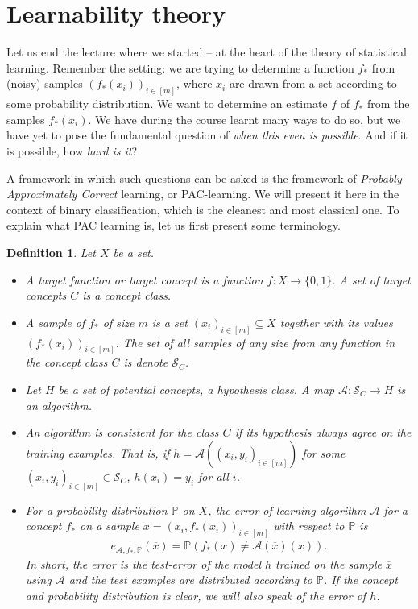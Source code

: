 \documentclass{article}
\newcommand{\calA}{\mathcal{A}}
\newcommand{\calS}{\mathcal{S}}
\newcommand{\sse}{\subseteq}
\newtheorem{defi}{Definition}
\begin{document}
   

\section{Learnability theory}
Let us end the lecture where we started -- at the heart of the theory of statistical learning. Remember the setting: we are trying to determine a function $f_*$ from (noisy) samples $(f_*(x_i))_{i \in [m]}$, where $x_i$ are drawn from a set according to some probability distribution. We want to determine an estimate $f$ of $f_*$ from the samples $f_*(x_i)$. We have during the course learnt many ways to do so, but we have yet to pose the fundamental question of \emph{when this even is possible}. And if it is possible, how \emph{hard is it}? 

A framework in which such questions can be asked is the framework of \emph{Probably Approximately Correct} learning, or PAC-learning.
We will present it here in the context of binary classification, which is the cleanest and most classical one. To explain what PAC learning is, let us first present some terminology.
\begin{defi}
    Let $X$ be a set. 
    \begin{itemize}
        \item A \emph{target function} or \emph{target concept} is a function $f:X \to \{0,1\}$. A set of target concepts $C$ is a \emph{concept class}. 

        \item A \emph{sample of $f_*$} of size $m$ is a set $(x_i)_{i \in [m]}\sse X$ together with its values $(f_*(x_i))_{i \in [m]}$. The set of all samples of any size from any function in the concept class $C$ is denote $\calS_C$.

        \item Let $H$ be a set of potential concepts, a \emph{hypothesis class}. A map $\calA : \calS_C \to H$ is an \emph{algorithm}.

        \item An algorithm is \emph{consistent for the class $C$} if its hypothesis always agree on the training examples. That is, if $h= \calA((x_i,y_i)_{i \in [m]})$ for some $(x_i,y_i)_{i \in [m]} \in \calS_C$,  $h(x_i)=y_i$ for all $i$.

        \item For a probability distribution $\mathbb{P}$ on $X$, the \emph{error of learning algorithm $\calA$ for a concept $f_*$ on a sample $\overline{x} = (x_i,f_*(x_i))_{i \in [m]}$ with respect to $\mathbb{P}$} is
        \begin{align*}
            e_{\calA,f_*,\mathbb{P}}(\overline{x}) = \mathbb{P}(f_*(x)\neq \calA(\overline{x})(x)).
        \end{align*}
        In short, the error is the test-error of the model $h$ trained on the sample $\overline{x}$ using $\calA$ and the test examples are distributed according to $\mathbb{P}$. If the concept and probability distribution is clear, we will also speak of the \emph{error of $h$}. 
    \end{itemize}
\end{defi}
\end{document}
